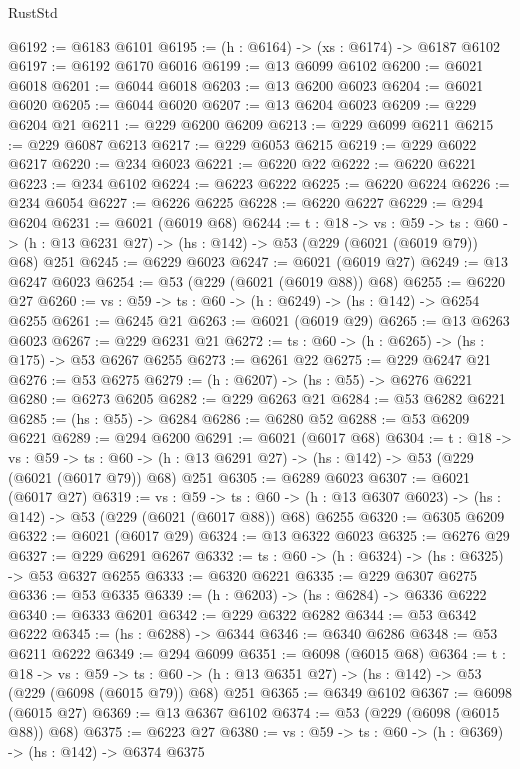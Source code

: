 \begin{lexlean}{RustStd}
\begin{coremodule}
@6192 := @6183 @6101
@6195 := (h : @6164) -> (xs : @6174) -> @6187 @6102
@6197 := @6192 @6170 @6016
@6199 := @13 @6099 @6102
@6200 := @6021 @6018
@6201 := @6044 @6018
@6203 := @13 @6200 @6023
@6204 := @6021 @6020
@6205 := @6044 @6020
@6207 := @13 @6204 @6023
@6209 := @229 @6204 @21
@6211 := @229 @6200 @6209
@6213 := @229 @6099 @6211
@6215 := @229 @6087 @6213
@6217 := @229 @6053 @6215
@6219 := @229 @6022 @6217
@6220 := @234 @6023
@6221 := @6220 @22
@6222 := @6220 @6221
@6223 := @234 @6102
@6224 := @6223 @6222
@6225 := @6220 @6224
@6226 := @234 @6054
@6227 := @6226 @6225
@6228 := @6220 @6227
@6229 := @294 @6204
@6231 := @6021 (@6019 @68)
@6244 := {t : @18} ->
  {vs : @59} ->
  {ts : @60} -> (h : @13 @6231 @27) -> (hs : @142) -> @53 (@229 (@6021 (@6019 @79)) @68) @251
@6245 := @6229 @6023
@6247 := @6021 (@6019 @27)
@6249 := @13 @6247 @6023
@6254 := @53 (@229 (@6021 (@6019 @88)) @68)
@6255 := @6220 @27
@6260 := {vs : @59} -> {ts : @60} -> (h : @6249) -> (hs : @142) -> @6254 @6255
@6261 := @6245 @21
@6263 := @6021 (@6019 @29)
@6265 := @13 @6263 @6023
@6267 := @229 @6231 @21
@6272 := {ts : @60} -> (h : @6265) -> (hs : @175) -> @53 @6267 @6255
@6273 := @6261 @22
@6275 := @229 @6247 @21
@6276 := @53 @6275
@6279 := (h : @6207) -> (hs : @55) -> @6276 @6221
@6280 := @6273 @6205
@6282 := @229 @6263 @21
@6284 := @53 @6282 @6221
@6285 := (hs : @55) -> @6284
@6286 := @6280 @52
@6288 := @53 @6209 @6221
@6289 := @294 @6200
@6291 := @6021 (@6017 @68)
@6304 := {t : @18} ->
  {vs : @59} ->
  {ts : @60} -> (h : @13 @6291 @27) -> (hs : @142) -> @53 (@229 (@6021 (@6017 @79)) @68) @251
@6305 := @6289 @6023
@6307 := @6021 (@6017 @27)
@6319 := {vs : @59} ->
  {ts : @60} -> (h : @13 @6307 @6023) -> (hs : @142) -> @53 (@229 (@6021 (@6017 @88)) @68) @6255
@6320 := @6305 @6209
@6322 := @6021 (@6017 @29)
@6324 := @13 @6322 @6023
@6325 := @6276 @29
@6327 := @229 @6291 @6267
@6332 := {ts : @60} -> (h : @6324) -> (hs : @6325) -> @53 @6327 @6255
@6333 := @6320 @6221
@6335 := @229 @6307 @6275
@6336 := @53 @6335
@6339 := (h : @6203) -> (hs : @6284) -> @6336 @6222
@6340 := @6333 @6201
@6342 := @229 @6322 @6282
@6344 := @53 @6342 @6222
@6345 := (hs : @6288) -> @6344
@6346 := @6340 @6286
@6348 := @53 @6211 @6222
@6349 := @294 @6099
@6351 := @6098 (@6015 @68)
@6364 := {t : @18} ->
  {vs : @59} ->
  {ts : @60} -> (h : @13 @6351 @27) -> (hs : @142) -> @53 (@229 (@6098 (@6015 @79)) @68) @251
@6365 := @6349 @6102
@6367 := @6098 (@6015 @27)
@6369 := @13 @6367 @6102
@6374 := @53 (@229 (@6098 (@6015 @88)) @68)
@6375 := @6223 @27
@6380 := {vs : @59} -> {ts : @60} -> (h : @6369) -> (hs : @142) -> @6374 @6375

\end{coremodule}
\end{lexlean}
